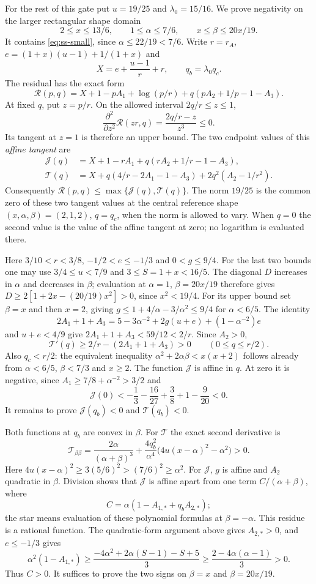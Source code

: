  For the rest of this gate put $u=19/25$ and
$\lambda_0=15/16$. We prove negativity on the larger rectangular shape domain
\[
 2\le x\le13/6,\qquad 1\le\alpha\le7/6,\qquad x\le\beta\le20x/19.
\]
It contains \eqref{eq:ss-small}, since $\alpha\le22/19<7/6$.
Write $r=r_A$, $e=(1+x)(u-1)+1/(1+x)$ and
\[
 X=e+\frac{u-1}{r}+r,\qquad q_b=\lambda_0q_c.
\]
The residual has the exact form
\[
 \mathcal R(p,q)=X+1-pA_1+\log(p/r)
                    +q(pA_2+1/p-1-A_3).
\]
At fixed $q$, put $z=p/r$. On the allowed interval $2q/r\le z\le1$,
\[
 \frac{\partial^2}{\partial z^2}\mathcal R(zr,q)
   =\frac{2q/r-z}{z^3}\le0.
\]
Its tangent at $z=1$ is therefore an upper bound. The two endpoint values of this
\emph{affine tangent} are
\begin{align*}
 \mathcal J(q)&=X+1-rA_1+q(rA_2+1/r-1-A_3),\\
 \mathcal T(q)&=X+q(4/r-2A_1-1-A_3)+2q^2(A_2-1/r^2).
\end{align*}
Consequently $\mathcal R(p,q)\le\max\{\mathcal J(q),\mathcal T(q)\}$.
The norm $19/25$ is the common zero of these two tangent values at the central reference
shape $(x,\alpha,\beta)=(2,1,2)$, $q=q_c$, when the norm is allowed to vary.
When $q=0$ the second value is the value of the affine tangent at zero;
no logarithm is evaluated there.

Here $3/10<r<3/8$, $-1/2<e\le-1/3$ and $0<g\le9/4$.
For the last two bounds one may use $3/4\le u<7/9$ and
$3\le S=1+x<16/5$. The diagonal $D$ increases in $\alpha$ and decreases in $\beta$;
evaluation at $\alpha=1$, $\beta=20x/19$ therefore gives
$D\ge2[1+2x-(20/19)x^2]>0$, since $x^2<19/4$.
For its upper bound set $\beta=x$ and then $x=2$, giving
$g\le1+4/\alpha-3/\alpha^2\le9/4$ for $\alpha<6/5$.
The identity
\[
 2A_1+1+A_3=5-3\alpha^{-2}+2g(u+e)+(1-\alpha^{-2})e
\]
and $u+e<4/9$ give $2A_1+1+A_3<59/12<2/r$.
Since $A_2>0$,
\[
 \mathcal T'(q)\ge2/r-(2A_1+1+A_3)>0\qquad(0\le q\le r/2).
\]
Also $q_c<r/2$: the equivalent inequality
$\alpha^2+2\alpha\beta<x(x+2)$ follows already from
$\alpha<6/5$, $\beta<7/3$ and $x\ge2$.
The function $\mathcal J$ is affine in $q$. At zero it is negative, since
$A_1\ge7/8+\alpha^{-2}>3/2$ and
\[
 \mathcal J(0)<-\frac13-\frac{16}{27}+\frac38+1-\frac9{20}<0.
\]
It remains to prove $\mathcal J(q_b)<0$ and $\mathcal T(q_b)<0$.

 Both functions at $q_b$ are convex in $\beta$.
For $\mathcal T$ the exact second derivative is
\[
 \mathcal T_{\beta\beta}
  =\frac{2\alpha}{(\alpha+\beta)^3}
   +\frac{4q_b^2}{\alpha^4}\bigl(4u(x-\alpha)^2-\alpha^2\bigr)>0.
\]
Here $4u(x-\alpha)^2\ge3(5/6)^2>(7/6)^2\ge\alpha^2$.
For $\mathcal J$, $g$ is affine and $A_2$ quadratic in $\beta$.
Division shows that $\mathcal J$ is affine apart from one term
$C/(\alpha+\beta)$, where
\[
 C=\alpha(1-A_{1,*}+q_bA_{2,*});
\]
the star means evaluation of these polynomial formulas at $\beta=-\alpha$.
This residue is a rational function. The quadratic-form argument above gives
$A_{2,*}>0$, and $e\le-1/3$ gives
\[
 \alpha^2(1-A_{1,*})
 \ge\frac{-4\alpha^2+2\alpha(S-1)-S+5}{3}
 \ge\frac{2-4\alpha(\alpha-1)}{3}>0.
\]
Thus $C>0$. It suffices to prove the two signs on $\beta=x$ and $\beta=20x/19$.

